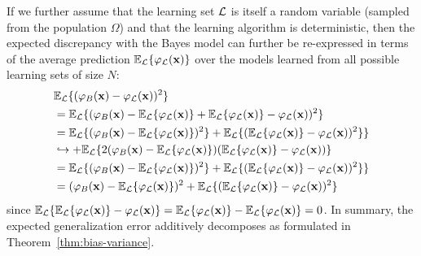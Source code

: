 If we further assume that the learning set ${\cal L}$ is itself a random
variable (sampled from the population $\Omega$) and that the learning algorithm is deterministic, then the expected
discrepancy with the Bayes model can further be re-expressed in terms of the
average prediction $\mathbb{E}_{\cal L} \{ \varphi_{\cal L}(\mathbf{x}) \}$
over the models learned from all possible learning sets of size $N$:
\begin{align}
& \mathbb{E}_{\cal L} \{ (\varphi_B(\mathbf{x}) - \varphi_{\cal L}(\mathbf{x}))^2 \}\nonumber \\
&= \mathbb{E}_{\cal L} \{ (\varphi_B(\mathbf{x}) - \mathbb{E}_{\cal L} \{ \varphi_{\cal L}(\mathbf{x}) \} + \mathbb{E}_{\cal L} \{ \varphi_{\cal L}(\mathbf{x}) \} - \varphi_{\cal L}(\mathbf{x}))^2 \} \nonumber \\
&= \mathbb{E}_{\cal L} \{ (\varphi_B(\mathbf{x}) - \mathbb{E}_{\cal L} \{ \varphi_{\cal L}(\mathbf{x}) \} )^2 \} + \mathbb{E}_{\cal L} \{ (\mathbb{E}_{\cal L} \{ \varphi_{\cal L}(\mathbf{x}) \} - \varphi_{\cal L}(\mathbf{x}))^2 \} \}\nonumber \\
& \hookrightarrow+ \mathbb{E}_{\cal L} \{ 2(\varphi_B(\mathbf{x}) - \mathbb{E}_{\cal L} \{ \varphi_{\cal L}(\mathbf{x}) \})(\mathbb{E}_{\cal L} \{ \varphi_{\cal L}(\mathbf{x}) \} - \varphi_{\cal L}(\mathbf{x}))\} \nonumber \\
&= \mathbb{E}_{\cal L} \{ (\varphi_B(\mathbf{x}) - \mathbb{E}_{\cal L} \{ \varphi_{\cal L}(\mathbf{x}) \} )^2 \} + \mathbb{E}_{\cal L} \{ (\mathbb{E}_{\cal L} \{ \varphi_{\cal L}(\mathbf{x}) \} - \varphi_{\cal L}(\mathbf{x}))^2 \} \}\nonumber \\
&= (\varphi_B(\mathbf{x}) - \mathbb{E}_{\cal L} \{ \varphi_{\cal L}(\mathbf{x}) \} )^2 + \mathbb{E}_{\cal L} \{ (\mathbb{E}_{\cal L} \{ \varphi_{\cal L}(\mathbf{x}) \} - \varphi_{\cal L}(\mathbf{x}))^2 \}
\end{align}
since $\mathbb{E}_{\cal L}\{ \mathbb{E}_{\cal L} \{ \varphi_{\cal
L}(\mathbf{x}) \} - \varphi_{\cal L}(\mathbf{x}) \} =  \mathbb{E}_{\cal L} \{
\varphi_{\cal L}(\mathbf{x}) \} -  \mathbb{E}_{\cal L} \{ \varphi_{\cal
L}(\mathbf{x}) \} = 0$. In summary, the expected generalization error additively
decomposes as formulated in Theorem~\ref{thm:bias-variance}.


